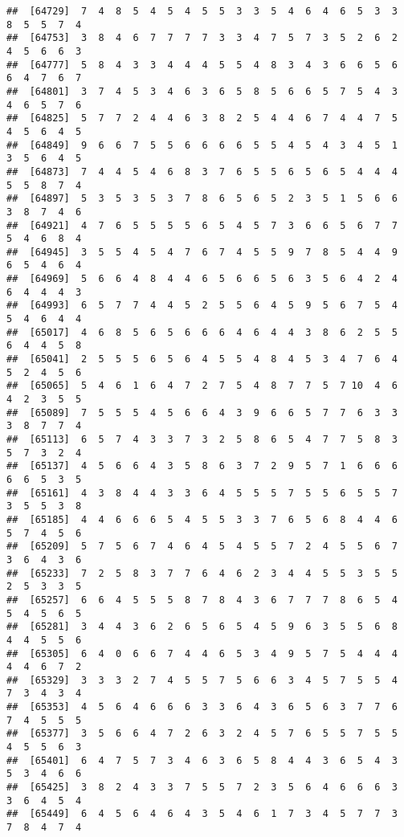 \documentclass[
]{book}
\begin{document}
\begin{verbatim}
##  [64729]  7  4  8  5  4  5  4  5  5  3  3  5  4  6  4  6  5  3  3  8  5  5  7  4
##  [64753]  3  8  4  6  7  7  7  7  3  3  4  7  5  7  3  5  2  6  2  4  5  6  6  3
##  [64777]  5  8  4  3  3  4  4  4  5  5  4  8  3  4  3  6  6  5  6  6  4  7  6  7
##  [64801]  3  7  4  5  3  4  6  3  6  5  8  5  6  6  5  7  5  4  3  4  6  5  7  6
##  [64825]  5  7  7  2  4  4  6  3  8  2  5  4  4  6  7  4  4  7  5  4  5  6  4  5
##  [64849]  9  6  6  7  5  5  6  6  6  6  5  5  4  5  4  3  4  5  1  3  5  6  4  5
##  [64873]  7  4  4  5  4  6  8  3  7  6  5  5  6  5  6  5  4  4  4  5  5  8  7  4
##  [64897]  5  3  5  3  5  3  7  8  6  5  6  5  2  3  5  1  5  6  6  3  8  7  4  6
##  [64921]  4  7  6  5  5  5  5  6  5  4  5  7  3  6  6  5  6  7  7  5  4  6  8  4
##  [64945]  3  5  5  4  5  4  7  6  7  4  5  5  9  7  8  5  4  4  9  6  5  4  6  4
##  [64969]  5  6  6  4  8  4  4  6  5  6  6  5  6  3  5  6  4  2  4  6  4  4  4  3
##  [64993]  6  5  7  7  4  4  5  2  5  5  6  4  5  9  5  6  7  5  4  5  4  6  4  4
##  [65017]  4  6  8  5  6  5  6  6  6  4  6  4  4  3  8  6  2  5  5  6  4  4  5  8
##  [65041]  2  5  5  5  6  5  6  4  5  5  4  8  4  5  3  4  7  6  4  5  2  4  5  6
##  [65065]  5  4  6  1  6  4  7  2  7  5  4  8  7  7  5  7 10  4  6  4  2  3  5  5
##  [65089]  7  5  5  5  4  5  6  6  4  3  9  6  6  5  7  7  6  3  3  3  8  7  7  4
##  [65113]  6  5  7  4  3  3  7  3  2  5  8  6  5  4  7  7  5  8  3  5  7  3  2  4
##  [65137]  4  5  6  6  4  3  5  8  6  3  7  2  9  5  7  1  6  6  6  6  6  5  3  5
##  [65161]  4  3  8  4  4  3  3  6  4  5  5  5  7  5  5  6  5  5  7  3  5  5  3  8
##  [65185]  4  4  6  6  6  5  4  5  5  3  3  7  6  5  6  8  4  4  6  5  7  4  5  6
##  [65209]  5  7  5  6  7  4  6  4  5  4  5  5  7  2  4  5  5  6  7  3  6  4  3  6
##  [65233]  7  2  5  8  3  7  7  6  4  6  2  3  4  4  5  5  3  5  5  2  5  3  3  5
##  [65257]  6  6  4  5  5  5  8  7  8  4  3  6  7  7  7  8  6  5  4  5  4  5  6  5
##  [65281]  3  4  4  3  6  2  6  5  6  5  4  5  9  6  3  5  5  6  8  4  4  5  5  6
##  [65305]  6  4  0  6  6  7  4  4  6  5  3  4  9  5  7  5  4  4  4  4  4  6  7  2
##  [65329]  3  3  3  2  7  4  5  5  7  5  6  6  3  4  5  7  5  5  4  7  3  4  3  4
##  [65353]  4  5  6  4  6  6  6  3  3  6  4  3  6  5  6  3  7  7  6  7  4  5  5  5
##  [65377]  3  5  6  6  4  7  2  6  3  2  4  5  7  6  5  5  7  5  5  4  5  5  6  3
##  [65401]  6  4  7  5  7  3  4  6  3  6  5  8  4  4  3  6  5  4  3  5  3  4  6  6
##  [65425]  3  8  2  4  3  3  7  5  5  7  2  3  5  6  4  6  6  6  3  3  6  4  5  4
##  [65449]  6  4  5  6  4  6  4  3  5  4  6  1  7  3  4  5  7  7  3  7  8  4  7  4

\end{verbatim}
\end{document}
